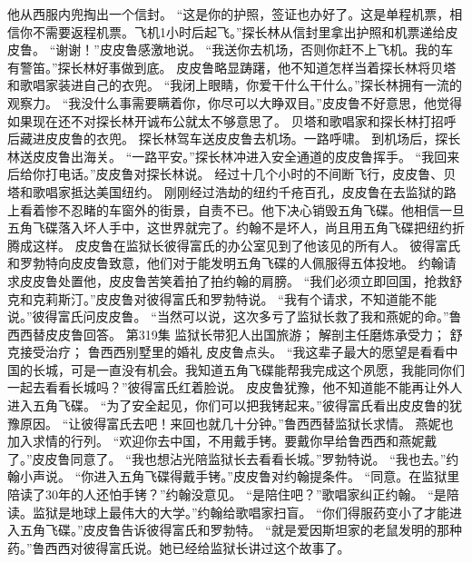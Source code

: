 \documentclass[a4paper,12pt,UTF8,twoside]{ctexbook}
\begin{document}
        他从西服内兜掏出一个信封。  
        “这是你的护照，签证也办好了。这是单程机票，相信你不需要返程机票。飞机1小时后起飞。”探长林从信封里拿出护照和机票递给皮皮鲁。  
        “谢谢！”皮皮鲁感激地说。  
        “我送你去机场，否则你赶不上飞机。我的车有警笛。”探长林好事做到底。  
        皮皮鲁略显踌躇，他不知道怎样当着探长林将贝塔和歌唱家装进自己的衣兜。  
        “我闭上眼睛，你爱干什么干什么。”探长林拥有一流的观察力。  
        “我没什么事需要瞒着你，你尽可以大睁双目。”皮皮鲁不好意思，他觉得如果现在还不对探长林开诚布公就太不够意思了。  
        贝塔和歌唱家和探长林打招呼后藏进皮皮鲁的衣兜。  
        探长林驾车送皮皮鲁去机场。一路呼啸。  
        到机场后，探长林送皮皮鲁出海关。  
        “一路平安。”探长林冲进入安全通道的皮皮鲁挥手。  
        “我回来后给你打电话。”皮皮鲁对探长林说。  
        经过十几个小时的不间断飞行，皮皮鲁、贝塔和歌唱家抵达美国纽约。  
        刚刚经过浩劫的纽约千疮百孔，皮皮鲁在去监狱的路上看着惨不忍睹的车窗外的街景，自责不已。他下决心销毁五角飞碟。他相信一旦五角飞碟落入坏人手中，这世界就完了。约翰不是坏人，尚且用五角飞碟把纽约折腾成这样。  
        皮皮鲁在监狱长彼得富氏的办公室见到了他该见的所有人。  
        彼得富氏和罗勃特向皮皮鲁致意，他们对于能发明五角飞碟的人佩服得五体投地。  
        约翰请求皮皮鲁处置他，皮皮鲁苦笑着拍了拍约翰的肩膀。  
        “我们必须立即回国，抢救舒克和克莉斯汀。”皮皮鲁对彼得富氏和罗勃特说。  
        “我有个请求，不知道能不能说。”彼得富氏问皮皮鲁。  
        “当然可以说，这次多亏了监狱长救了我和燕妮的命。”鲁西西替皮皮鲁回答。          第319集  
        监狱长带犯人出国旅游；  
        解剖主任磨炼承受力；  
        舒克接受治疗；  
        鲁西西别墅里的婚礼    
        皮皮鲁点头。  
        “我这辈子最大的愿望是看看中国的长城，可是一直没有机会。我知道五角飞碟能帮我完成这个夙愿，我能同你们一起去看看长城吗？”彼得富氏红着脸说。  
        皮皮鲁犹豫，他不知道能不能再让外人进入五角飞碟。  
        “为了安全起见，你们可以把我铐起来。”彼得富氏看出皮皮鲁的犹豫原因。  
        “让彼得富氏去吧！来回也就几十分钟。”鲁西西替监狱长求情。 
        燕妮也加入求情的行列。  
        “欢迎你去中国，不用戴手铐。要戴你早给鲁西西和燕妮戴了。”皮皮鲁同意了。  
        “我也想沾光陪监狱长去看看长城。”罗勃特说。  
        “我也去。”约翰小声说。  
        “你进入五角飞碟得戴手铐。”皮皮鲁对约翰提条件。  
        “同意。在监狱里陪读了30年的人还怕手铐？”约翰没意见。  
        “是陪住吧？”歌唱家纠正约翰。  
        “是陪读。监狱是地球上最伟大的大学。”约翰给歌唱家扫盲。  
        “你们得服药变小了才能进入五角飞碟。”皮皮鲁告诉彼得富氏和罗勃特。  
        “就是爱因斯坦家的老鼠发明的那种药。”鲁西西对彼得富氏说。她已经给监狱长讲过这个故事了。  
\end{document}
